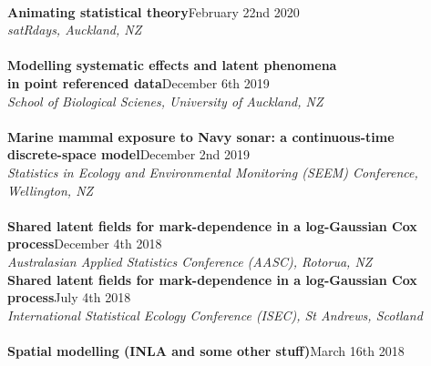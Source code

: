 \documentclass[10pt,letter]{article}
\begin{document}
                 \hdashrule[0.5ex]{4cm}{1pt}{1pt}\\
                           {\textbf{Animating statistical theory}}\hfill February 22nd 2020\\
                           {\sl satRdays, Auckland, NZ}\\
                           \hdashrule[0.5ex]{4cm}{1pt}{1pt}\\
                           {\textbf{Modelling systematic effects and latent phenomena \\
                                         in point referenced data}}\hfill December 6th 2019\\
                                     {\sl School of Biological Scienes, University of Auckland, NZ}\\
                                     \hdashrule[0.5ex]{4cm}{1pt}{1pt}\\
                                               {\textbf{Marine mammal exposure to Navy sonar: a continuous-time \\
                                                   discrete-space model}}\hfill December 2nd 2019\\
                                               {\sl Statistics in Ecology and Environmental Monitoring (SEEM) Conference, Wellington, NZ}\\
                                               \hdashrule[0.5ex]{4cm}{1pt}{1pt}\\
                                                         {\textbf{Shared latent fields for mark-dependence in a log-Gaussian Cox process}}\hfill December 4th 2018\\
                                                         {\sl Australasian Applied Statistics Conference (AASC), Rotorua, NZ}\\
                                                         \newpage
                                                         \noindent
{\textbf{Shared latent fields for mark-dependence in a log-Gaussian Cox process}}\hfill July 4th 2018\\
 {\sl International Statistical Ecology Conference (ISEC), St Andrews, Scotland}\\
 \hdashrule[0.5ex]{4cm}{1pt}{1pt}\\
{\textbf{Spatial modelling (INLA and some other stuff)}}\hfill March 16th 2018\\
\end{document}
